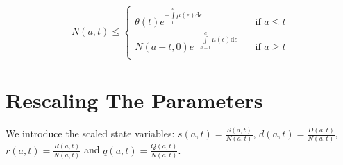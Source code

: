 \[ N(a,t) \leq
  \begin{cases}
    \theta (t) e^{-\int\limits_{0}^{a} \mu(\epsilon) \mathrm{d}\epsilon}
       & \quad \text{if } a \leq t\\
    N(a-t,0) e^{-\int\limits_{a-t}^{a} \mu(\epsilon) \mathrm{d}\epsilon} 
       & \quad \text{if } a \geq t\\
  \end{cases}
\]
%
%
%
%
%
%

\section{Rescaling The Parameters}
 We introduce the scaled state variables:
 $s(a,t)=\frac{S(a,t)}{N(a,t)}$, $d(a,t)=\frac{D(a,t)}{N(a,t)}$, $r(a,t)=\frac{R(a,t)}{N(a,t)}$ and $q(a,t)=\frac{Q(a,t)}{N(a,t)}.$

